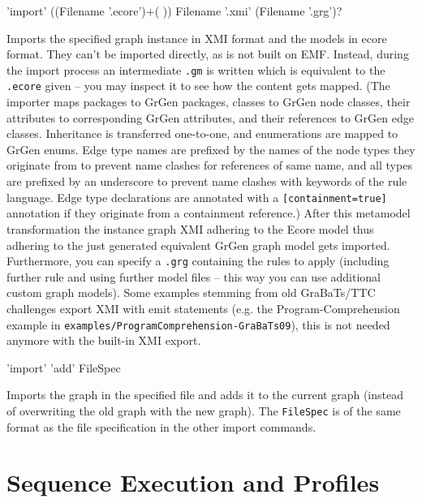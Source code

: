 \begin{rail}
  'import' ((Filename '.ecore')+( )) Filename '.xmi' (Filename '.grg')?
\end{rail}\label{shellecoreexport}
Imports the specified graph instance in XMI format and the models in ecore format.
They can't be imported directly, as \GrG{ } is not built on EMF.
Instead, during the import process an intermediate \texttt{.gm} is written which is equivalent to the \texttt{.ecore} given -- you may inspect it to see how the content gets mapped.
(The importer maps packages to GrGen packages, classes to GrGen node classes, their attributes to corresponding GrGen attributes, and their references to GrGen edge classes.
Inheritance is transferred one-to-one, and enumerations are mapped to GrGen enums.
Edge type names are prefixed by the names of the node types they originate from to prevent name clashes for references of same name,
and all types are prefixed by an underscore to prevent name clashes with keywords of the rule language.
Edge type declarations are annotated with a \verb#[containment=true]# annotation if they originate from a containment reference.)
After this metamodel transformation the instance graph XMI adhering to the Ecore model thus adhering to the just
generated equivalent GrGen graph model gets imported.
Furthermore, you can specify a \texttt{.grg} containing the rules to apply (including further rule and using further model files -- this way you can use additional custom graph models).
Some examples stemming from old GraBaTs/TTC challenges export XMI with emit statements (e.g. the Program-Comprehension example in \texttt{examples/ProgramComprehension-GraBaTs09}), this is not needed anymore with the built-in XMI export.

\begin{rail}
  'import' 'add' FileSpec
\end{rail}
Imports the graph in the specified file and adds it to the current graph
(instead of overwriting the old graph with the new graph).
The \texttt{FileSpec} is of the same format as the file specification in the other import commands.


\section{Sequence Execution and Profiles}\label{grsthings}

